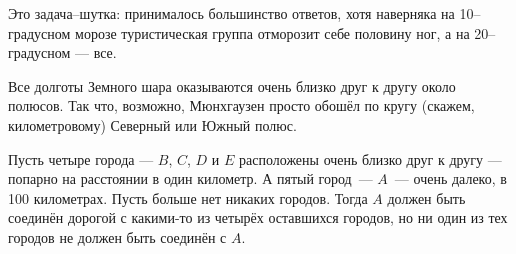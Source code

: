 \begin{itemize}
\itA Это задача–шутка: принималось большинство ответов, хотя наверняка на 10--градусном морозе туристическая группа отморозит себе половину ног, а на 20--градусном — все.

\itB Все долготы Земного шара оказываются очень близко друг к другу около полюсов. Так что, возможно, Мюнхгаузен просто обошёл по кругу (скажем, километровому) Северный или Южный полюс.

\itC Пусть четыре города — $B$, $C$, $D$ и $E$ расположены очень близко друг к другу — попарно на расстоянии в один километр. А пятый город~— $A$~— очень далеко, в 100 километрах. Пусть больше нет никаких городов. Тогда $A$ должен быть соединён дорогой с какими-то из  четырёх оставшихся городов, но ни один из тех городов не должен быть соединён с $A$.
\end{itemize}